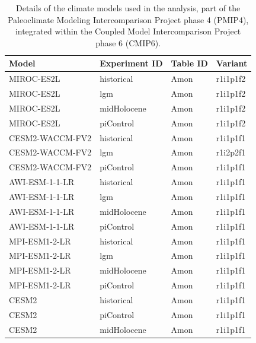 \documentclass[a4paper,12pt]{article}
\begin{document}
\setcounter{table}{1}

\begin{table}[!hbtp]
\centering
\caption{Details of the climate models used in the analysis, part of the Paleoclimate Modeling Intercomparison Project phase 4 (PMIP4), integrated within the Coupled Model Intercomparison Project phase 6 (CMIP6).}
\begin{small} %
\begin{tabular}{llll}
\hline
\textbf{Model} & \textbf{Experiment ID} & \textbf{Table ID} & \textbf{Variant} \\
\hline
MIROC-ES2L & historical & Amon & r1i1p1f2 \\
MIROC-ES2L & lgm & Amon & r1i1p1f2 \\
MIROC-ES2L & midHolocene & Amon & r1i1p1f2 \\
MIROC-ES2L & piControl & Amon & r1i1p1f2 \\
CESM2-WACCM-FV2 & historical & Amon & r1i1p1f1 \\
CESM2-WACCM-FV2 & lgm & Amon & r1i2p2f1 \\
CESM2-WACCM-FV2 & piControl & Amon & r1i1p1f1 \\
AWI-ESM-1-1-LR & historical & Amon & r1i1p1f1 \\
AWI-ESM-1-1-LR & lgm & Amon & r1i1p1f1 \\
AWI-ESM-1-1-LR & midHolocene & Amon & r1i1p1f1 \\
AWI-ESM-1-1-LR & piControl & Amon & r1i1p1f1 \\
MPI-ESM1-2-LR & historical & Amon & r1i1p1f1 \\
MPI-ESM1-2-LR & lgm & Amon & r1i1p1f1 \\
MPI-ESM1-2-LR & midHolocene & Amon & r1i1p1f1 \\
MPI-ESM1-2-LR & piControl & Amon & r1i1p1f1 \\
CESM2 & historical & Amon & r1i1p1f1 \\
CESM2 & piControl & Amon & r1i1p1f1 \\
CESM2 & midHolocene & Amon & r1i1p1f1 \\
\hline
\end{tabular}
\end{small}
\label{tab:climate_models}
\end{table}
\end{document}
